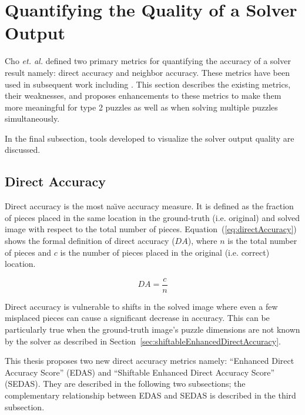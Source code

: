 \documentclass{report}
\def\eref#1{(\ref{#1})}
\begin{document}
\pagebreak
\section{Quantifying the Quality of a Solver Output}\label{sec:quantifyingSolverQuantify}

Cho \textit{et. al.} \cite{cho2010} defined two primary metrics for quantifying the accuracy of a solver result namely: direct accuracy and neighbor accuracy. These metrics have been used in subsequent work including \cite{sholomon2013, pomeranz2011, paikin2015, son2014, gallagher2012}.  This section describes the existing metrics, their weaknesses, and proposes enhancements to these metrics to make them more meaningful for type 2 puzzles as well as when solving multiple puzzles simultaneously.

In the final subsection, tools developed to visualize the solver output quality are discussed.

\subsection{Direct Accuracy}\label{sec:directAccuracy}

Direct accuracy is the most na\"{\i}ve accuracy measure.  It is defined as the fraction of pieces placed in the same location in the ground-truth (i.e. original) and solved image with respect to the total number of pieces.  Equation~\eref{eq:directAccuracy} shows the formal definition of direct accuracy ($DA$), where $n$ is the total number of pieces and $c$ is the number of pieces placed in the original (i.e. correct) location.

\begin{equation} \label{eq:directAccuracy}
DA = \frac{c}{n}
\end{equation}

Direct accuracy is vulnerable to shifts in the solved image where even a few misplaced pieces can cause a significant decrease in accuracy.  This can be particularly true when the ground-truth image's puzzle dimensions are not known by the solver as described in Section~\ref{sec:shiftableEnhancedDirectAccuracy}.

This thesis proposes two new direct accuracy metrics namely: ``Enhanced Direct Accuracy Score'' (EDAS) and ``Shiftable Enhanced Direct Accuracy Score'' (SEDAS).  They are described in the following two subsections; the complementary relationship between EDAS and SEDAS is described in the third subsection.
\end{document}
